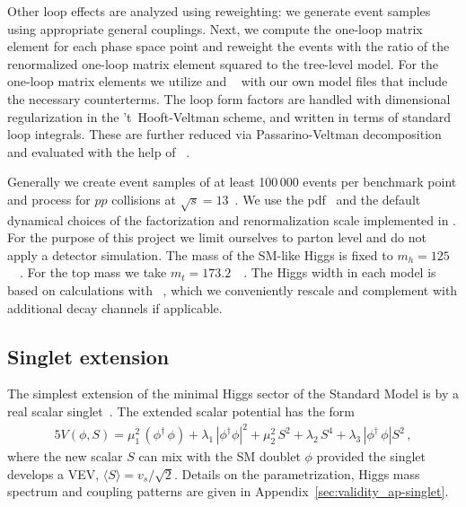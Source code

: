 Other loop effects are analyzed using reweighting: we generate event
samples using appropriate general couplings. Next, we compute the
one-loop matrix element for each phase space point and reweight the
events with the ratio of the renormalized one-loop matrix element
squared to the tree-level model. For the one-loop matrix elements we
utilize  and ~\cite{Hahn:2000kx}
with our own model files that include the necessary counterterms. The
loop form factors are handled with dimensional regularization in the
't~Hooft-Veltman scheme, and written in terms of standard loop
integrals. These are further reduced via Passarino-Veltman
decomposition and evaluated with the help of
~\cite{Hahn:1998yk}.

Generally we create event samples of at least 100\,000 events per
benchmark point and process for $pp$ collisions at $\sqrt{s} =
13$~\tev. We use the  pdf~\cite{CTEQ6L} and the
default dynamical choices of the factorization and renormalization
scale implemented in . For the purpose of this
project we limit ourselves to parton level and do not apply a detector
simulation.  The mass of the SM-like Higgs is fixed to $m_h =
125$~\gev~\cite{higgsmass}. For the top mass we take $m_t =
173.2$~\gev~\cite{topmass}. The Higgs width in each model is based on
calculations with ~\cite{hdecay}, which we
conveniently rescale and complement with additional decay channels if
applicable.








\subsection{Singlet extension}
\label{sec:validity_singlet}

The simplest extension of the minimal Higgs sector of the Standard
Model is by a real scalar singlet~\cite{singlet}. The extended scalar
potential has the form
%
\begin{alignat}{5} V(\phi,S) = \mu^2_1\,(\phi^\dagger\,\phi) +
\lambda_1\,|\phi^{\dagger}\phi|^2 + \mu^2_2\,S^2 + \lambda_2\,S^4 +
\lambda_3\,|\phi^{\dagger}\,\phi|S^2 \,,
\label{eq:singlet-potential}
\end{alignat}
%
where the new scalar $S$ can mix with the SM doublet $\phi$ provided
the singlet develops a VEV, $\langle S \rangle =
v_s/\sqrt{2}$. Details on the parametrization, Higgs mass spectrum and
coupling patterns are given in Appendix~\ref{sec:validity_ap-singlet}.

